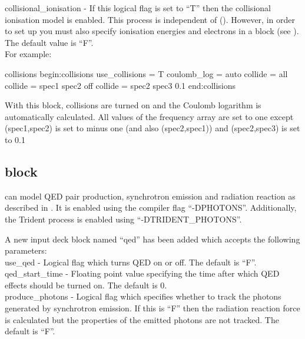 {\emphtext collisional\_ionisation} - If this logical flag is set to ``T''
  then the collisional ionisation model is enabled. This process is independent
  of  (). However, in order to
  set up 
  you must also specify ionisation energies and electrons in a
   block (see ). The default value
  is ``F''.\\

For example:

\begin{lboxverbatim}{collisions}
begin:collisions
   use_collisions = T
   coulomb_log = auto
   collide = all
   collide = spec1 spec2 off
   collide = spec2 spec3 0.1
end:collisions
\end{lboxverbatim}

  With this block, collisions are turned on and the Coulomb logarithm is
  automatically calculated. All values of the frequency array are set
  to one except (spec1,spec2) is set to minus one (and also (spec2,spec1))
  and (spec2,spec3) is set to 0.1


\subsection{ block}
\label{sec:qed_block}

{\EPOCH} can model QED pair production, synchrotron emission and
radiation reaction as described in \citet{Duclous}.
It is enabled using the compiler flag ``-DPHOTONS''. Additionally,
the Trident process is enabled using ``-DTRIDENT\_PHOTONS''.

A new input deck block named ``qed'' has been added which accepts the
following parameters:\\

{\emphtext use\_qed} - Logical flag which turns QED on or off. The default
  is ``F''.\\

{\emphtext qed\_start\_time} - Floating point value specifying the time after
  which QED effects should be turned on. The default is 0.\\

{\emphtext produce\_photons} - Logical flag which specifies whether to track
  the photons generated by synchrotron emission. If this is ``F'' then the
  radiation reaction force is calculated but the properties of the emitted
  photons are not tracked. The default is ``F''.\\

